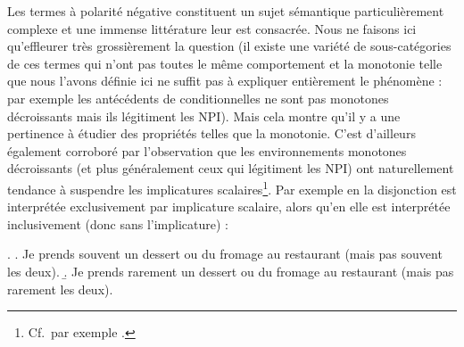 Les termes à polarité négative constituent un sujet sémantique particulièrement complexe et une immense littérature leur est consacrée.  Nous ne faisons ici qu'effleurer très grossièrement la question (il existe une variété de sous-catégories de ces termes qui n'ont pas toutes le même comportement et la monotonie telle que nous l'avons définie ici ne suffit pas à expliquer entièrement le phénomène : par exemple les antécédents de conditionnelles ne sont pas monotones décroissants mais ils légitiment les NPI).  Mais cela montre qu'il y a une pertinence à étudier des propriétés telles que la monotonie.
C'est d'ailleurs également corroboré par l'observation que les environnements monotones décroissants (et plus généralement ceux qui légitiment les NPI) ont naturellement tendance à suspendre les implicatures scalaires\footnote{Cf.\ par exemple \citet[chap.~4]{Horn:89}.}. Par exemple en \Next[a] la disjonction est interprétée exclusivement par implicature scalaire, alors qu'en \Next[b] elle est interprétée inclusivement (donc sans l'implicature) :

\ex.
\a. Je prends souvent un dessert ou du fromage au restaurant (mais pas souvent les deux).
\b. Je prends rarement un dessert ou du fromage au restaurant (\zarb mais pas rarement les deux).





\medskip

